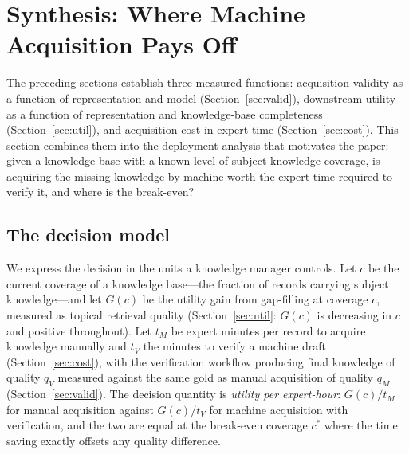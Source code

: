 
\section{Synthesis: Where Machine Acquisition Pays Off}
\label{sec:synth}

The preceding sections establish three measured functions: acquisition
validity as a function of representation and model
(Section~\ref{sec:valid}), downstream utility as a function of
representation and knowledge-base completeness (Section~\ref{sec:util}),
and acquisition cost in expert time (Section~\ref{sec:cost}). This section
combines them into the deployment analysis that motivates the paper: given
a knowledge base with a known level of subject-knowledge coverage, is
acquiring the missing knowledge by machine worth the expert time required
to verify it, and where is the break-even?

\subsection{The decision model}

We express the decision in the units a knowledge manager controls. Let
$c$ be the current coverage of a knowledge base---the fraction of records
carrying subject knowledge---and let $G(c)$ be the utility gain from
gap-filling at coverage $c$, measured as topical retrieval quality
(Section~\ref{sec:util}: $G(c)$ is decreasing in $c$ and positive
throughout). Let $t_M$ be expert minutes per record to acquire knowledge
manually and $t_V$ the minutes to verify a machine draft
(Section~\ref{sec:cost}), with the verification workflow producing final
knowledge of quality $q_V$ measured against the same gold as manual
acquisition of quality $q_M$ (Section~\ref{sec:valid}). The decision
quantity is \emph{utility per expert-hour}: $G(c) / t_M$ for manual
acquisition against $G(c) / t_V$ for machine acquisition with
verification, and the two are equal at the break-even coverage
$c^{*}$ where the time saving exactly offsets any quality difference.

